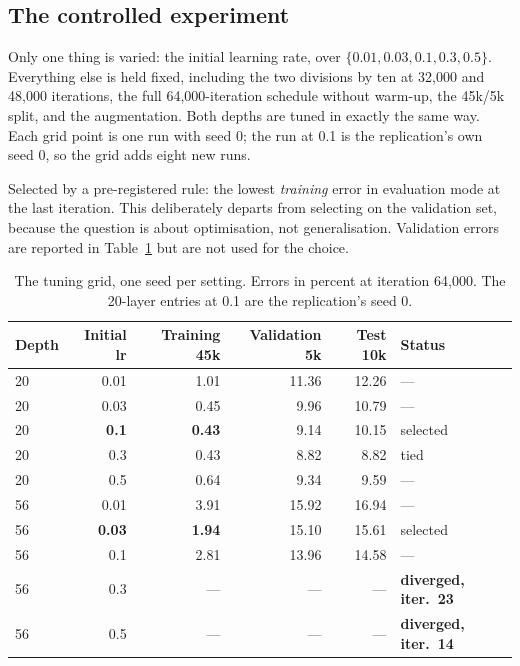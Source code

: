 \documentclass[11pt,a4paper]{article}
\begin{document}
\subsection{The controlled experiment}

Only one thing is varied: the initial learning rate, over $\{0.01, 0.03, 0.1,
0.3, 0.5\}$. Everything else is held fixed, including the two divisions by ten
at 32{,}000 and 48{,}000 iterations, the full 64{,}000-iteration schedule
without warm-up, the 45k/5k split, and the augmentation. Both depths are tuned
in exactly the same way. Each grid point is one run with seed 0; the run at 0.1
is the replication's own seed 0, so the grid adds eight new runs.

Selected by a pre-registered rule: the lowest \emph{training} error in
evaluation mode at the last iteration. This deliberately departs from selecting
on the validation set, because the question is about optimisation, not
generalisation. Validation errors are reported in Table~\ref{tab:tuning} but are
not used for the choice.

\begin{table}[h]
\centering
\begin{tabular}{@{}lrrrrl@{}}
\toprule
Depth & Initial lr & Training 45k & Validation 5k & Test 10k & Status \\
\midrule
20 & 0.01 & 1.01 & 11.36 & 12.26 & --- \\
20 & 0.03 & 0.45 & 9.96 & 10.79 & --- \\
20 & \textbf{0.1} & \textbf{0.43} & 9.14 & 10.15 & selected \\
20 & 0.3 & 0.43 & 8.82 & 8.82 & tied \\
20 & 0.5 & 0.64 & 9.34 & 9.59 & --- \\
\midrule
56 & 0.01 & 3.91 & 15.92 & 16.94 & --- \\
56 & \textbf{0.03} & \textbf{1.94} & 15.10 & 15.61 & selected \\
56 & 0.1 & 2.81 & 13.96 & 14.58 & --- \\
56 & 0.3 & --- & --- & --- & \textbf{diverged, iter.\ 23} \\
56 & 0.5 & --- & --- & --- & \textbf{diverged, iter.\ 14} \\
\bottomrule
\end{tabular}
\caption{The tuning grid, one seed per setting. Errors in percent at
iteration 64{,}000. The 20-layer entries at 0.1 are the replication's seed 0.}
\label{tab:tuning}
\end{table}
\end{document}
